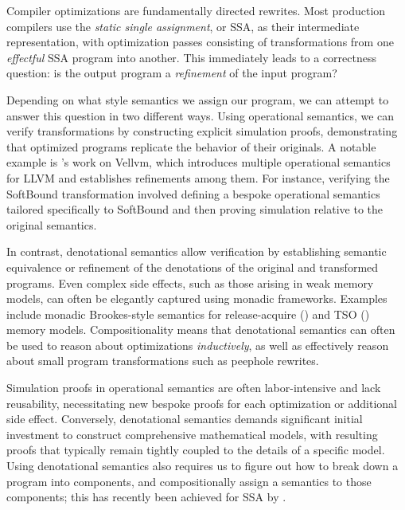 \documentclass[acmsmall,screen,review]{acmart}
\begin{document}
Compiler optimizations are fundamentally directed rewrites. Most production compilers use the
\emph{static single assignment}, or SSA, as their intermediate representation, with optimization
passes consisting of transformations from one \emph{effectful} SSA program into another. This
immediately leads to a correctness question: is the output program a \emph{refinement} of the input
program?

Depending on what style semantics we assign our program, we can attempt to answer this question in
two different ways. Using operational semantics, we can verify transformations by constructing
explicit simulation proofs, demonstrating that optimized programs replicate the behavior of their
originals. A notable example is \citet{vellvm-12}'s work on Vellvm, which introduces multiple
operational semantics for LLVM and establishes refinements among them. For instance, verifying the
SoftBound transformation \cite{nagarakatte-softbound-09} involved defining a bespoke operational
semantics tailored specifically to SoftBound and then proving simulation relative to the original
semantics.

In contrast, denotational semantics allow verification by establishing semantic equivalence or
refinement of the denotations of the original and transformed programs. Even complex side effects,
such as those arising in weak memory models, can often be elegantly captured using monadic
frameworks. Examples include monadic Brookes-style semantics for release-acquire
(\citet{release-acquire}) and TSO (\citet{jagadeesan-brookes-relaxed-12}) memory models.
Compositionality means that denotational semantics can often be used to reason about optimizations
\emph{inductively}, as well as effectively reason about small program transformations such as
peephole rewrites.

Simulation proofs in operational semantics are often labor-intensive and lack reusability,
necessitating new bespoke proofs for each optimization or additional side effect. Conversely,
denotational semantics demands significant initial investment to construct comprehensive
mathematical models, with resulting proofs that typically remain tightly coupled to the details of a
specific model. Using denotational semantics also requires us to figure out how to break down a
program into components, and compositionally assign a semantics to those components; this has
recently been achieved for SSA by \citet{ghalayini-24-ssa-densem-arxiv}.
\end{document}

